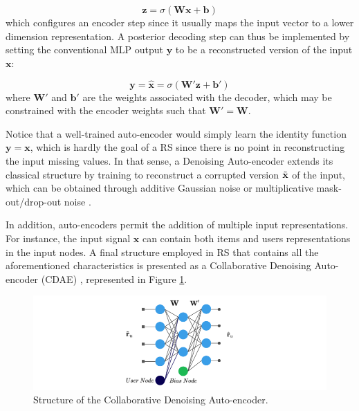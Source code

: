     \begin{equation*}
        \mathbf{z} = \sigma(\mathbf{W}\mathbf{x} + \mathbf{b})
    \end{equation*}which configures an encoder step since it usually maps the input vector to a lower dimension representation. A posterior decoding step can thus be implemented by setting the conventional MLP output $\mathbf{y}$ to be a reconstructed version of the input $\mathbf{x}$:
    
    \begin{equation*}
        \mathbf{y} = \hat{\mathbf{x}} = \sigma(\mathbf{W}'\mathbf{z} + \mathbf{b}')
    \end{equation*} where $\mathbf{W}'$ and $\mathbf{b}'$ are the weights associated with the decoder, which may be constrained with the encoder weights such that $\mathbf{W}' = \mathbf{W}$.
    
    Notice that a well-trained auto-encoder would simply learn the identity function $\mathbf{y} = \mathbf{x}$, which is hardly the goal of a RS since there is no point in reconstructing the input missing values. In that sense, a Denoising Auto-encoder extends its classical structure by training to reconstruct a corrupted version $\Tilde{\mathbf{x}}$ of the input, which can be obtained through additive Gaussian noise or multiplicative mask-out/drop-out noise \cite{10.1145/1390156.1390294}. 
    
    In addition, auto-encoders permit the addition of multiple input representations. For instance, the input signal $\mathbf{x}$ can contain both items and users representations in the input nodes. A final structure employed in RS that contains all the aforementioned characteristics is presented as a Collaborative Denoising Auto-encoder (CDAE)  \cite{10.1145/2835776.2835837}, represented in Figure \ref{fig:cdae}.
    
   \begin{figure}[ht]
        \centering
        \includegraphics[width=\textwidth]{figs/cdae.png}
        \caption{Structure of the Collaborative Denoising Auto-encoder.}
        \label{fig:cdae}
    \end{figure}

